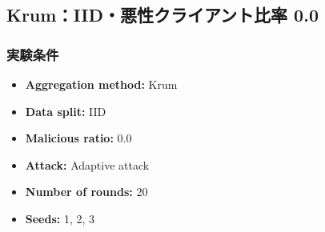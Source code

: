 \documentclass[a4j,twocolumn,dvipdfmx]{jsarticle}
\begin{document}
\subsection{Krum：IID・悪性クライアント比率 0.0}

\subsubsection{実験条件}

\begin{itemize}
    \item \textbf{Aggregation method:} Krum
    \item \textbf{Data split:} IID
    \item \textbf{Malicious ratio:} 0.0
    \item \textbf{Attack:} Adaptive attack
    \item \textbf{Number of rounds:} 20
    \item \textbf{Seeds:} 1, 2, 3
\end{itemize}

\end{document}
